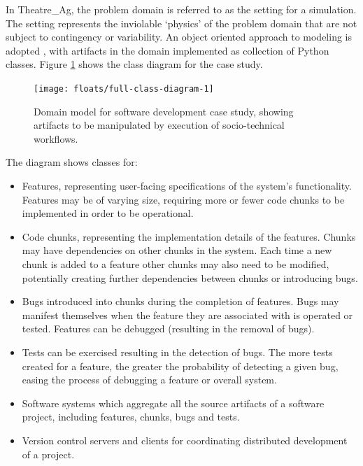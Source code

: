 \documentclass{llncs}
\begin{document}
In Theatre\_Ag, the problem domain is referred to as the setting for a simulation.  The setting represents the inviolable
‘physics’ of the problem domain that are not subject to contingency or variability. An object oriented approach to
modeling is adopted \cite{bennett06object}, with artifacts in the domain implemented as collection of Python classes.
Figure \ref{fig:domain} shows the class diagram for the case study.

\begin{figure}
  \centering
  \texttt{[image: floats/full-class-diagram-1]}
  \caption{Domain model for software development case study, showing artifacts to be manipulated by execution of
    socio-technical workflows.}
  \label{fig:domain}
\end{figure}


The diagram shows classes for:

\begin{itemize}
\item Features, representing user-facing specifications of the system's functionality.  Features may be of varying size,
  requiring more or fewer code chunks to be implemented in order to be operational.

\item Code chunks, representing the implementation details of the features. Chunks may have dependencies on other chunks
  in the system.  Each time a new chunk is added to a feature other chunks may also need to be modified, potentially
  creating further dependencies between chunks or introducing bugs.

\item Bugs introduced into chunks during the completion of features.  Bugs may manifest themselves when the feature they
  are associated with is operated or tested.  Features can be debugged (resulting in the removal of bugs).

\item Tests can be exercised resulting in the detection of bugs.  The more tests created for a feature, the greater the
  probability of detecting a given bug, easing the process of debugging a feature or overall system.

\item Software systems which aggregate all the source artifacts of a software project, including features, chunks, bugs
  and tests.

\item Version control servers and clients for coordinating distributed development of a project.
\end{itemize}
\end{document}
